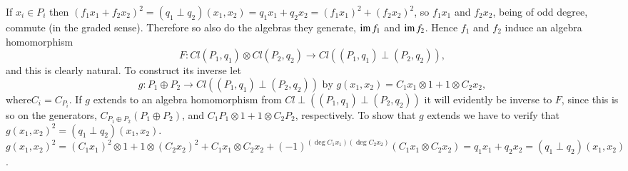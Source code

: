 If $x_i \in P_i$ then $(f_1 x_1 + f_2 x_2)^2 = (q_1 \perp q_2
)(x_1, x_2) = q_1 x_1 + q_2 x_2  = (f_1 x_1)^2 + (f_2 x_2)^2$, so $f_1
x_1$ and $f_2 x_2$, being of odd degree, commute (in the graded
sense). Therefore so also do the algebras they generate, $\operatorname{im} f_1$
and $\operatorname{im} f_2$. Hence $f_1$ and $f_2$ induce an algebra homomorphism 
$$
F : Cl (P_1, q_1) \otimes Cl (P_2, q_2) \to Cl ((P_1, q_1) \perp (P_2,
q_2)), 
$$
and this is clearly natural. To construct its inverse let  
$$
g : P_1 \oplus P_2 \to Cl ((P_1, q_1) \perp (P_2, q_2)) \text{ by }
g(x_1, x_2) = C_1 x_1 \otimes 1 + 1 \otimes C_2 x_2, 
$$
where\pageoriginale $C_i = C_{P_i}$. If $g$ extends to an algebra
homomorphism from 
$Cl \perp ((P_1, q_1) \perp (P_2, q_2))$ it will evidently be inverse
to $F$, since this is so on the generators, $C_{P_1 \oplus P_2}(P_1
\oplus P_2)$, and $C_1 P_1 \otimes 1+ 1 \otimes C_2 P_2$, respectively.
To show that $g$ extends we have to verify that $g(x_1, x_2)^2 = (q_1
\perp q_2) (x_1, x_2)$. $g(x_1, x_2)^2 = (C_1 x_1)^2 \otimes 1 + 1
\otimes (C_2 x_2)^2 + C_1 x_1 \otimes C_2 x_2 + (-1)^{(\deg C_1 x_1)
  (\deg C_2 x_2)} (C_1 x_1 \otimes C_2 x_2) = q_1 x_1 + q_2 x_2 = (q_1
\perp q_2 ) (x_1 , x_2)$. 

